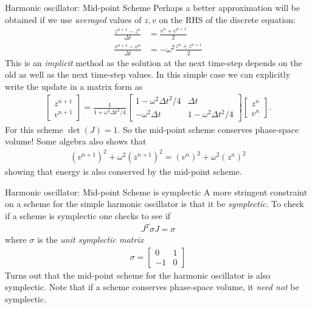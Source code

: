 \documentclass[aspectratio=43]{beamer}
\begin{document}
\begin{frame}{Harmonic oscillator: Mid-point Scheme}
  \small%
  Perhaps a better approximation will be obtained if we use
  \emph{averaged} values of $z,v$ on the RHS of the discrete
  equation:
  \begin{align*}
    \frac{z^{n+1}-z^n}{\Delta t} &= \frac{v^n +v^{n+1}}{2} \\
    \frac{v^{n+1}-v^n}{\Delta t} &= -\omega^2\frac{z^n + z^{n+1}}{2}
  \end{align*}
  This is an \emph{implicit} method as the solution at the next
  time-step depends on the old as well as the next time-step
  values. In this simple case we can explicitly write the update in a
  matrix form as
  \begin{align*}
    \left[
    \begin{matrix}
      z^{n+1} \\
      v^{n+1}
    \end{matrix}
      \right]
      =
      \frac{1}{1+\omega^2\Delta t^2/4}
    \left[
      \begin{matrix}
        1-\omega^2\Delta t^2/4  & \Delta t \\
        -\omega^2 \Delta t & 1-\omega^2\Delta t^2/4
      \end{matrix}
    \right]
    \left[
    \begin{matrix}
      z^{n} \\
      v^{n}
    \end{matrix}
    \right].                        
  \end{align*}
  For this scheme $\det(J)=1$. So the mid-point scheme conserves
  phase-space volume! Some algebra also shows that
  \begin{align*}
    (v^{n+1})^2 + \omega^2 (z^{n+1})^2 = (v^{n})^2 + \omega^2 (z^{n})^2
  \end{align*}
  showing that energy is also conserved by the mid-point scheme.
\end{frame}

\begin{frame}{Harmonic oscillator: Mid-point Scheme is symplectic}
  A more stringent constraint on a scheme for the simple harmonic
  oscillator is that it be \emph{symplectic}. To check if a scheme is
  symplectic one checks to see if
  \begin{align*}
    J^T\sigma J = \sigma
  \end{align*}
  where $\sigma$ is the \emph{unit symplectic matrix}
  \begin{align*}
    \sigma
    =
    \left[
      \begin{matrix}
        0 & 1 \\
        -1 & 0
      \end{matrix}
    \right]    
  \end{align*}
  Turns out that the mid-point scheme for the harmonic oscillator is
  also symplectic. Note that if a scheme conserves phase-space
  volume, it \emph{need not} be symplectic.
\end{frame}
\end{document}

